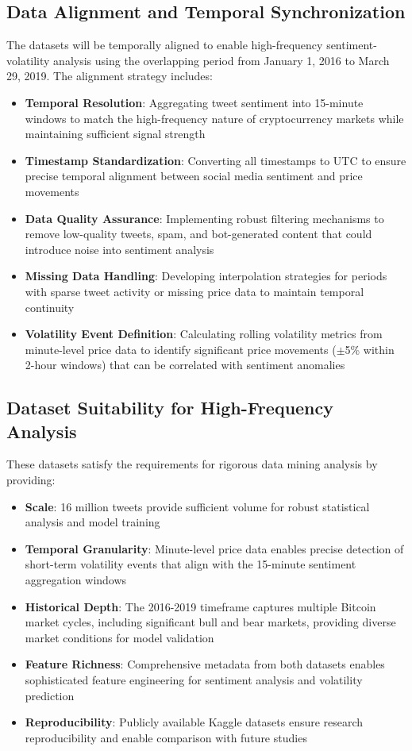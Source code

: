 \documentclass[11pt,twocolumn]{article}
\begin{document}
\subsection{\textbf{Data Alignment and Temporal Synchronization}}
The datasets will be temporally aligned to enable high-frequency sentiment-volatility analysis using the overlapping period from January 1, 2016 to March 29, 2019. The alignment strategy includes:

\begin{itemize}
\item \textbf{Temporal Resolution}: Aggregating tweet sentiment into 15-minute windows to match the high-frequency nature of cryptocurrency markets while maintaining sufficient signal strength
\item \textbf{Timestamp Standardization}: Converting all timestamps to UTC to ensure precise temporal alignment between social media sentiment and price movements
\item \textbf{Data Quality Assurance}: Implementing robust filtering mechanisms to remove low-quality tweets, spam, and bot-generated content that could introduce noise into sentiment analysis
\item \textbf{Missing Data Handling}: Developing interpolation strategies for periods with sparse tweet activity or missing price data to maintain temporal continuity
\item \textbf{Volatility Event Definition}: Calculating rolling volatility metrics from minute-level price data to identify significant price movements ($\pm$5\% within 2-hour windows) that can be correlated with sentiment anomalies
\end{itemize}

\subsection{\textbf{Dataset Suitability for High-Frequency Analysis}}
These datasets satisfy the requirements for rigorous data mining analysis by providing:

\begin{itemize}
\item \textbf{Scale}: 16 million tweets provide sufficient volume for robust statistical analysis and model training
\item \textbf{Temporal Granularity}: Minute-level price data enables precise detection of short-term volatility events that align with the 15-minute sentiment aggregation windows
\item \textbf{Historical Depth}: The 2016-2019 timeframe captures multiple Bitcoin market cycles, including significant bull and bear markets, providing diverse market conditions for model validation
\item \textbf{Feature Richness}: Comprehensive metadata from both datasets enables sophisticated feature engineering for sentiment analysis and volatility prediction
\item \textbf{Reproducibility}: Publicly available Kaggle datasets ensure research reproducibility and enable comparison with future studies
\end{itemize}
\end{document}

